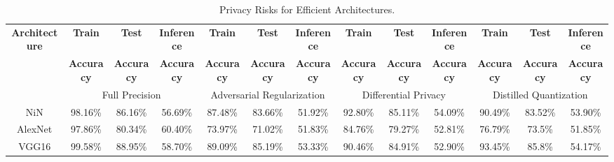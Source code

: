 \begin{table*}[!htb]
\begin{center}
\renewcommand\arraystretch{1.5}
\fontsize{6.7pt}{6.7pt}\selectfont
\begin{tabular}{|c||c|c|c||c|c|c||c|c|c||c|c|c|}
\hline
\textbf{Architecture} & \textbf{Train}  & \textbf{Test}  & \textbf{Inference}  & \textbf{Train}  & \textbf{Test}  & \textbf{Inference} & \textbf{Train}  & \textbf{Test}  & \textbf{Inference} & \textbf{Train}  & \textbf{Test}  & \textbf{Inference}  \\
 & \textbf{Accuracy} & \textbf{Accuracy} & \textbf{Accuracy} & \textbf{Accuracy} & \textbf{Accuracy} & \textbf{Accuracy} & \textbf{Accuracy} & \textbf{Accuracy} & \textbf{Accuracy} & \textbf{Accuracy} & \textbf{Accuracy} & \textbf{Accuracy}\\
\hline
& \multicolumn{3}{|c|}{Full Precision} & \multicolumn{3}{c|}{Adversarial Regularization} & \multicolumn{3}{c|}{Differential Privacy} & \multicolumn{3}{c|}{Distilled Quantization}\\
\hline
NiN & 98.16\% & 86.16\% & 56.69\% & 87.48\% & 83.66\% & 51.92\%  & 92.80\% & 85.11\% & 54.09\%  & 90.49\% & 83.52\% & 53.90\%\\
AlexNet & 97.86\% & 80.34\% & 60.40\% & 73.97\% & 71.02\% & 51.83\%  & 84.76\% & 79.27\% & 52.81\%  & 76.79\% & 73.5\% & 51.85\%\\
VGG16 & 99.58\% & 88.95\% & 58.70\% & 89.09\% & 85.19\% & 53.33\%  & 90.46\% & 84.91\% & 52.90\%  & 93.45\% & 85.8\% & 54.17\%\\
\hline
\end{tabular}
\end{center}
\caption{Privacy Risks for Efficient Architectures.}
\label{stdarch}
\end{table*}
